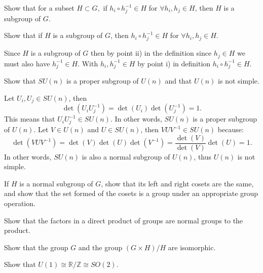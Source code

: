\documentclass[notes.tex]{subfiles}
\begin{document}
\begin{Exercise}[]
Show that for a subset $H\subset G,$ if $h_i \circ h_j^{-1} \in H$ for $\forall h_i, h_j\in H$, then $H$ is a subgroup of $G$.
\end{Exercise}

\begin{Exercise}[]
Show that if $H$ is a subgroup of $G$, then $h_i \circ h_j^{-1} \in H$ for $\forall h_i, h_j\in H$.
\end{Exercise}

\begin{Answer}
Since $H$ is a subgroup of $G$ then by point ii) in the definition since $h_j\in H$ we must also have $h_j^{-1} \in H$. With $h_i, h_j^{-1} \in H$ by point i) in definition $h_i  \circ h_j^{-1} \in H$.
\end{Answer}

\begin{Exercise}[label=ex:SUn_normal]
Show that $SU(n)$ is a proper subgroup of $U(n)$ and that $U(n)$ is not simple.
\end{Exercise}

\begin{Answer}
Let $U_i, U_j \in SU(n)$, then 
\[\det(U_i U_j^{-1}) = \det(U_i)\det(U_j^{-1}) = 1.\]
This means that $U_i U^{-1}_j \in SU(n)$. In other words, $SU(n)$ is a proper subgroup of $U(n)$. Let $V \in U(n)$ and $U \in SU(n)$, then $VUV^{-1} \in SU(n)$ because:
\[\det(VUV^{-1}) = \det(V)\det(U)\det(V^{-1}) = \frac{\det(V)}{\det(V)} \det(U) = 1.\]
In other words, $SU(n)$ is also a normal subgroup of $U(n)$, thus $U(n)$ is not simple.
\end{Answer}

\begin{Exercise}[]
If $H$ is a normal subgroup of $G$, show that its left and right cosets are the same, and show that the set formed of the cosets is a group under an appropriate group operation.
\end{Exercise}

\begin{Exercise}[]
Show that the factors in a direct product of groups are normal groups to the product.
\end{Exercise}

\begin{Exercise}[]
Show that the group $G$ and the group $(G\times H) / H$ are isomorphic.
\end{Exercise}

\begin{Exercise}[]
Show that $U(1)\cong\mathbb{R}/\mathbb{Z}\cong SO(2)$.
\end{Exercise}
\end{document}
